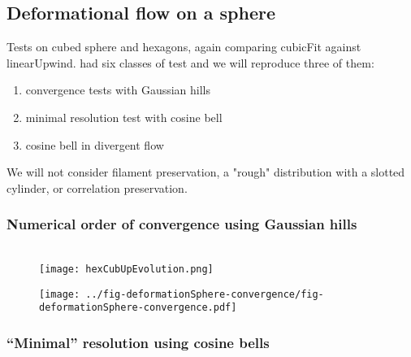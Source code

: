 \subsection{Deformational flow on a sphere}


Tests on cubed sphere and hexagons, again comparing cubicFit against linearUpwind.  \citet{lauritzen2012} had six classes of test and we will reproduce three of them:
\begin{enumerate}
	\item convergence tests with Gaussian hills
	\item minimal resolution test with cosine bell
	\item cosine bell in divergent flow
\end{enumerate}
We will not consider filament preservation, a "rough" distribution with a slotted cylinder, or correlation preservation.

\subsubsection{Numerical order of convergence using Gaussian hills}
\begin{figure}
	 \\
	\texttt{[image: hexCubUpEvolution.png]} \\
	\caption{}
\end{figure}

\begin{figure}
	\texttt{[image: ../fig-deformationSphere-convergence/fig-deformationSphere-convergence.pdf]}
	\caption{}
\end{figure}

\subsubsection{``Minimal'' resolution using cosine bells}

